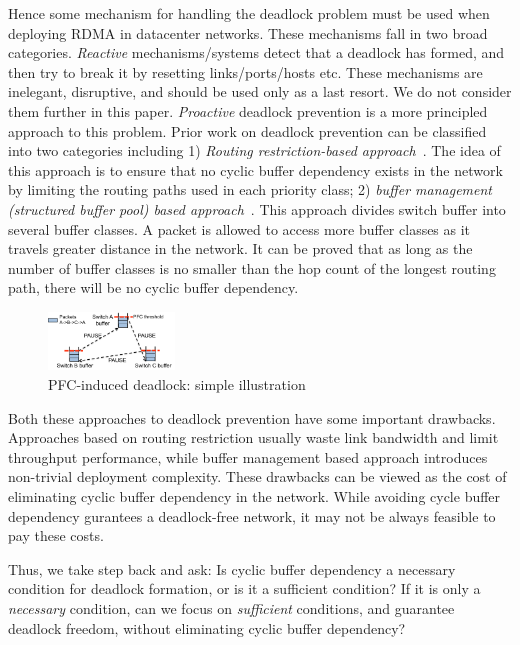 Hence some mechanism for handling the deadlock problem must be used when
deploying RDMA in datacenter networks.  These mechanisms fall in two broad
categories. {\em Reactive} mechanisms/systems detect that a deadlock has formed,
and then try to break it by resetting links/ports/hosts etc.  These mechanisms
are inelegant, disruptive, and should be used only as a last resort.  We do not
consider them further in this paper.  {\em Proactive} deadlock prevention is a
more principled approach to this problem.  Prior work on deadlock prevention can
be classified into two categories including 1) \textit{Routing restriction-based
approach}~\cite{tcpbolt,flich2012survey}. The idea of this approach is to ensure
that no cyclic buffer dependency exists in the network by limiting the routing
paths used in each priority class;  2) \textit{buffer management (structured
buffer pool) based approach}~\cite{gerla1980flow,karol2003prevention}. This
approach divides switch buffer into several buffer classes. A packet is allowed
to access more buffer classes as it travels greater distance in the network. It
can be proved that as long as the number of buffer classes is no smaller than
the hop count of the longest routing path, there will be no cyclic buffer
dependency.

\begin{figure}
\centering
\includegraphics[width=0.3\textwidth] {figs/deadlock}
\vspace{-0.15in}
\caption{PFC-induced deadlock: simple illustration}
\vspace{-0.25in}
\label{fig:deadlock_example}
\end{figure}

Both these approaches to deadlock prevention have some important drawbacks.
Approaches based on routing restriction usually waste link bandwidth and limit
throughput performance, while buffer management based approach introduces
non-trivial deployment complexity. These drawbacks can be viewed as the cost of
eliminating cyclic buffer dependency in the network. While avoiding cycle buffer
dependency gurantees a deadlock-free network, it may not be always feasible to
pay these costs.

Thus, we take step back and ask: Is cyclic buffer dependency a
necessary condition for deadlock formation, or is it a sufficient condition? If
it is only a {\em necessary} condition, can we focus on {\em sufficient}
conditions, and guarantee deadlock freedom, without  eliminating cyclic buffer
dependency?

